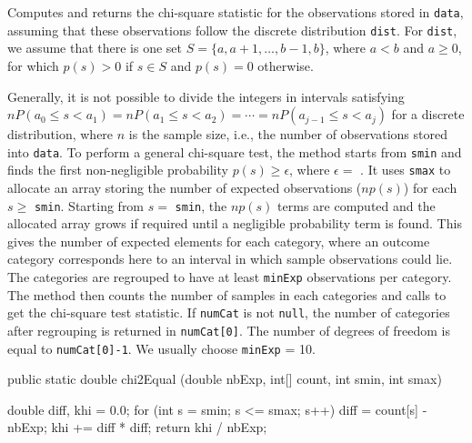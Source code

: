 \begin{tabb}   Computes and returns the chi-square statistic for the
   observations stored in \texttt{data}, assuming that these observations follow
   the discrete distribution \texttt{dist}.  For \texttt{dist}, we assume that
   there is one set $S=\{a, a+1,\dots, b-1, b\}$, where $a<b$ and $a\ge 0$,
   for which  $p(s)>0$ if $s\in S$ and $p(s)=0$ otherwise.

   Generally, it is not possible to divide the integers in intervals satisfying
   $nP(a_0\le s< a_1)=nP(a_1\le s< a_2)=\cdots=nP(a_{j-1}\le s< a_j)$
   for a discrete distribution, where $n$ is the sample size, i.e.,
   the number of
   observations stored into \texttt{data}.
   To perform a general chi-square test, the method starts
   from \texttt{smin} and finds the first non-negligible
   probability $p(s)\ge\epsilon$, where
   $\epsilon=$ .
   It uses \texttt{smax} to allocate an array storing the
   number of expected observations ($np(s)$) for each $s\ge$ \texttt{smin}.
   Starting from $s=$ \texttt{smin}, the $np(s)$ terms are computed and
   the allocated array grows if required until a negligible probability
   term is found.
   This gives the number of expected elements for
   each category, where an outcome category corresponds here to
   an interval in which sample observations could lie.
   The categories are regrouped to have at least
   \texttt{minExp} observations per category.
   The method then counts the number of samples in each categories and calls
    to get the chi-square test
   statistic.  If \texttt{numCat} is not
   \texttt{null}, the number of categories after regrouping is returned
   in \texttt{numCat[0]}. The number of degrees of freedom is equal to
   \texttt{numCat[0]-1}. We usually choose \texttt{minExp} = 10.
\end{tabb}
\begin{htmlonly}
\end{htmlonly}
\begin{code}

   public static double chi2Equal (double nbExp, int[] count,
                                   int smin, int smax)\begin{hide} {

      double diff, khi = 0.0;
      for (int s = smin; s <= smax; s++) {
         diff = count[s] - nbExp;
         khi += diff * diff;
      }
      return khi / nbExp;
   }\end{hide}
\end{code}
